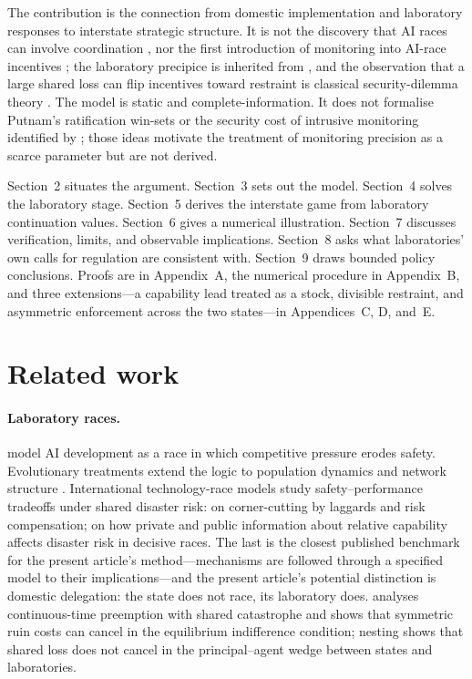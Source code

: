 \documentclass[11pt]{article}
\theoremstyle{plain}
\theoremstyle{definition}
\theoremstyle{remark}
\begin{document}
The contribution is the connection from domestic implementation and laboratory responses to interstate strategic structure. It is not the discovery that AI races can involve coordination \citep{abraham2025}, nor the first introduction of monitoring into AI-race incentives \citep{bova2023}; the laboratory precipice is inherited from \citet{armstrong2016}, and the observation that a large shared loss can flip incentives toward restraint is classical security-dilemma theory \citep{jervis1978,snyder1971}. The model is static and complete-information. It does not formalise Putnam's ratification win-sets or the security cost of intrusive monitoring identified by \citet{coe2020}; those ideas motivate the treatment of monitoring precision as a scarce parameter but are not derived.

Section~2 situates the argument. Section~3 sets out the model. Section~4 solves the laboratory stage. Section~5 derives the interstate game from laboratory continuation values. Section~6 gives a numerical illustration. Section~7 discusses verification, limits, and observable implications. Section~8 asks what laboratories' own calls for regulation are consistent with. Section~9 draws bounded policy conclusions. Proofs are in Appendix~A, the numerical procedure in Appendix~B, and three extensions---a capability lead treated as a stock, divisible restraint, and asymmetric enforcement across the two states---in Appendices~C, D, and~E.

\section{Related work}

\paragraph{Laboratory races.} \citet{armstrong2016} model AI development as a race in which competitive pressure erodes safety. Evolutionary treatments extend the logic to population dynamics and network structure \citep{han2020,cimpeanu2022}. International technology-race models study safety--performance tradeoffs under shared disaster risk: \citet{stafford2022} on corner-cutting by laggards and risk compensation; \citet{emery2024} on how private and public information about relative capability affects disaster risk in decisive races. The last is the closest published benchmark for the present article's method---mechanisms are followed through a specified model to their implications---and the present article's potential distinction is domestic delegation: the state does not race, its laboratory does. \citet{tan2025} analyses continuous-time preemption with shared catastrophe and shows that symmetric ruin costs can cancel in the equilibrium indifference condition; nesting shows that shared loss does not cancel in the principal--agent wedge between states and laboratories.
\end{document}
